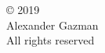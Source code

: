 
\thispagestyle{empty} %
\null\vfill %
\begin{center}
  \SingleSpace %
© 2019\\
Alexander Gazman\\
All rights reserved\\
\end{center}
